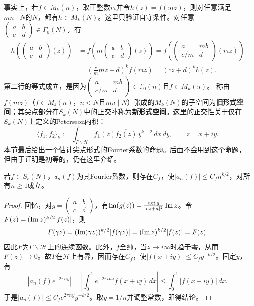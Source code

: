 事实上，若$f\in M_k(n)$，取正整数$m$并令$h(z)=f(mz)$，则对任意满足$mn\mid N$的$N$，都有$h\in M_k(N)$。这里只验证自守条件。对任意$\begin{pmatrix}a&b\\c&d\end{pmatrix}\in\Gamma_0(N)$，有
\begin{align*}
h\!\left(\begin{pmatrix}a&b\\c&d\end{pmatrix}(z)\right)
&=f\!\left(m\begin{pmatrix}a&b\\c&d\end{pmatrix}(z)\right)
=f\!\left(\begin{pmatrix}a&mb\\c/m&d\end{pmatrix}(mz)\right)\\
&=\left(\frac cm mz+d\right)^k f(mz)=(cz+d)^k h(z).
\end{align*}
第二行的等式成立，是因为$\begin{pmatrix}a&mb\\c/m&d\end{pmatrix}\in\Gamma_0(n)$且$f\in M_k(n)$。
称由$f(mz)$（$f\in M_k(n)$，$n<N$且$mn\mid N$）张成的$M_k(N)$的子空间为\textbf{旧形式空间}；其尖点部分在$S_k(N)$中的正交补称为\textbf{新形式空间}。这里的正交性关于仅在$S_k(N)$上定义的Petersson内积：
\[\langle f_1,f_2\rangle_k:=\int_{\Gamma\backslash\mathcal H}f_1(z)\overline{f_2(z)}\,y^{k-2}\,dx\,dy,\qquad z=x+iy.\]
本节最后给出一个估计尖点形式的Fourier系数的命题。后面不会用到这个命题，但由于证明是初等的，仍在这里介绍。
\begin{proposition}\label{L6S1O5}
若$f\in S_k(N)$，$a_n(f)$为其Fourier系数，则存在$C_f$，使$|a_n(f)|\leq C_fn^{k/2}$，对所有$n\geq1$成立。
\end{proposition}
\begin{proof}
回忆，对$g=\begin{pmatrix}a&b\\c&d\end{pmatrix}$，有$\operatorname{Im}(g(z))=\frac{\det g}{|cz+d|^2}\operatorname{Im} z$。令$F(z)=(\operatorname{Im} z)^{k/2}|f(z)|$，则
\[F(\gamma z)=(\operatorname{Im}(\gamma z))^{k/2}|f(\gamma z)|=(\operatorname{Im} z)^{k/2}|f(z)|=F(z).\]
因此$F$为$\Gamma\backslash\mathcal H$上的连续函数。此外，$f$全纯，当$z\to i\infty$时趋于零，从而$F(z)\to0$。故$F$在$\mathcal H$上有界，因而存在$C_f$，使$|f(x+iy)|\leq C_fy^{-k/2}$。固定$y$，有
\[|a_n(f)e^{-2\pi ny}|=\left|\int_0^1e^{-2\pi inx}f(x+iy)\,dx\right|\leq\int_0^1|f(x+iy)|\,dx.\]
于是$|a_n(f)|\leq C_fe^{2\pi ny}y^{-k/2}$。取$y=1/n$并调整常数，即得结论。
\end{proof}
